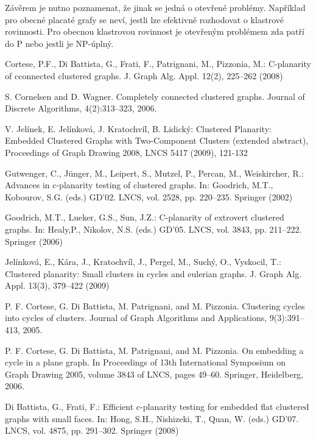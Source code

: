 \documentclass[12pt,a4report]{report}
\theoremstyle{definition}
\begin{document}
Závěrem je nutno poznamenat, že jinak se jedná o otevřené problémy. Například pro obecné placaté grafy se neví, jestli lze efektivně rozhodovat o klastrové rovinnosti. Pro obecnou klastrovou rovinnost je otevřeným problémem zda patří do P nebo jestli je NP-úplný.


\begin{thebibliography}{9}

	Cortese, P.F., Di Battista, G., Frati, F., Patrignani, M., Pizzonia, M.: C-planarity of cconnected clustered graphs. J. Graph Alg. Appl. 12(2), 225–262 (2008)

	S. Cornelsen and D. Wagner. Completely connected clustered graphs. Journal of Discrete Algorithms, 4(2):313–323, 2006.

	V. Jelínek, E. Jelínková, J. Kratochvíl, B. Lidický: Clustered Planarity: Embedded Clustered Graphs with Two-Component Clusters (extended abstract), Proceedings of Graph Drawing 2008, LNCS 5417 (2009), 121-132

	Gutwenger, C., Jünger, M., Leipert, S., Mutzel, P., Percan, M., Weiskircher, R.: Advances in c-planarity testing of clustered graphs. In: Goodrich, M.T., Kobourov, S.G. (eds.) GD’02. LNCS, vol. 2528, pp. 220–235. Springer (2002)

	Goodrich, M.T., Lueker, G.S., Sun, J.Z.: C-planarity of extrovert clustered graphs. In: Healy,P., Nikolov, N.S. (eds.) GD’05. LNCS, vol. 3843, pp. 211–222. Springer (2006)

	Jelínková, E., Kára, J., Kratochvíl, J., Pergel, M., Suchý, O., Vyskocil, T.: Clustered planarity: Small clusters in cycles and eulerian graphs. J. Graph Alg. Appl. 13(3), 379–422 (2009)

P. F. Cortese, G. Di Battista, M. Patrignani, and M. Pizzonia. Clustering cycles into cycles of clusters. Journal of Graph Algorithms and Applications,
9(3):391–413, 2005.

	P. F. Cortese, G. Di Battista, M. Patrignani, and M. Pizzonia. On embedding a cycle in a plane graph. In Proceedings of 13th International Symposium on Graph Drawing 2005, volume 3843 of LNCS, pages 49–60. Springer, Heidelberg, 2006.

	Di Battista, G., Frati, F.: Efficient c-planarity testing for embedded flat clustered graphs with small faces. In: Hong, S.H., Nishizeki, T., Quan, W. (eds.) GD’07. LNCS, vol. 4875, pp. 291–302. Springer (2008)


\end{thebibliography}
\end{document}
